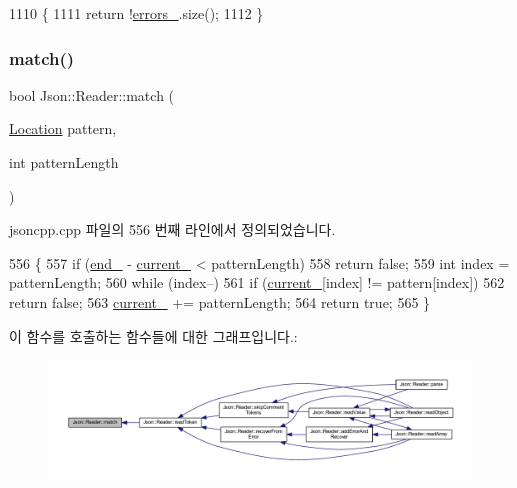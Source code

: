 \begin{DoxyCode}
1110                         \{
1111   \textcolor{keywordflow}{return} !\hyperlink{class_json_1_1_reader_a1bbce45dc4df753bed60c129f4b5147c}{errors\_}.size();
1112 \}
\end{DoxyCode}
\mbox{\label{class_json_1_1_reader_a3e5a7bc6b7b53f2ca8cb9da42f8ffb21}} 
\subsubsection{\texorpdfstring{match()}{match()}}
{\footnotesize\ttfamily bool Json\+::\+Reader\+::match (\begin{DoxyParamCaption}\item[{\hyperlink{class_json_1_1_reader_a46795b5b272bf79a7730e406cb96375a}{Location}}]{pattern,  }\item[{int}]{pattern\+Length }\end{DoxyParamCaption})\hspace{0.3cm}{\ttfamily [private]}}



jsoncpp.\+cpp 파일의 556 번째 라인에서 정의되었습니다.


\begin{DoxyCode}
556                                                       \{
557   \textcolor{keywordflow}{if} (\hyperlink{class_json_1_1_reader_a714793579cbf4ee7c5a7223d2c8d77c1}{end\_} - \hyperlink{class_json_1_1_reader_a2f2feb5201a26da7aa133d2f7434479b}{current\_} < patternLength)
558     \textcolor{keywordflow}{return} \textcolor{keyword}{false};
559   \textcolor{keywordtype}{int} index = patternLength;
560   \textcolor{keywordflow}{while} (index--)
561     \textcolor{keywordflow}{if} (\hyperlink{class_json_1_1_reader_a2f2feb5201a26da7aa133d2f7434479b}{current\_}[index] != pattern[index])
562       \textcolor{keywordflow}{return} \textcolor{keyword}{false};
563   \hyperlink{class_json_1_1_reader_a2f2feb5201a26da7aa133d2f7434479b}{current\_} += patternLength;
564   \textcolor{keywordflow}{return} \textcolor{keyword}{true};
565 \}
\end{DoxyCode}
이 함수를 호출하는 함수들에 대한 그래프입니다.\+:\nopagebreak
\begin{figure}[H]
\begin{center}
\leavevmode
\includegraphics[width=350pt]{class_json_1_1_reader_a3e5a7bc6b7b53f2ca8cb9da42f8ffb21_icgraph}
\end{center}
\end{figure}
\mbox{\label{class_json_1_1_reader_af1da6c976ad1e96c742804c3853eef94}} 
